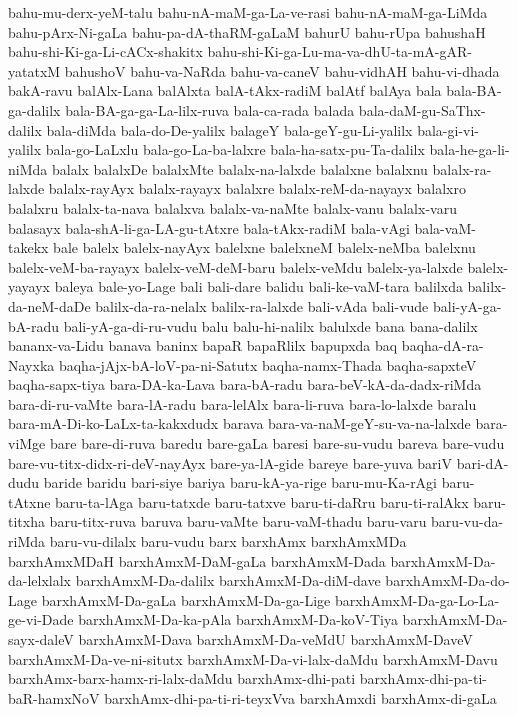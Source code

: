 {bahu-mu-derx-yeM-talu
bahu-nA-maM-ga-La-ve-rasi
bahu-nA-maM-ga-LiMda
bahu-pArx-Ni-gaLa
bahu-pa-dA-thaRM-gaLaM
bahurU
bahu-rUpa
bahushaH
bahu-shi-Ki-ga-Li-cACx-shakitx
bahu-shi-Ki-ga-Lu-ma-va-dhU-ta-mA-gAR-yatatxM
bahushoV
bahu-va-NaRda
bahu-va-caneV
bahu-vidhAH
bahu-vi-dhada
bakA-ravu
balAlx-Lana
balAlxta
balA-tAkx-radiM
balAtf
balAya
bala
bala-BA-ga-dalilx
bala-BA-ga-ga-La-lilx-ruva
bala-ca-rada
balada
bala-daM-gu-SaThx-dalilx
bala-diMda
bala-do-De-yalilx
balageY
bala-geY-gu-Li-yalilx
bala-gi-vi-yalilx
bala-go-LaLxlu
bala-go-La-ba-lalxre
bala-ha-satx-pu-Ta-dalilx
bala-he-ga-li-niMda
balalx
balalxDe
balalxMte
balalx-na-lalxde
balalxne
balalxnu
balalx-ra-lalxde
balalx-rayAyx
balalx-rayayx
balalxre
balalx-reM-da-nayayx
balalxro
balalxru
balalx-ta-nava
balalxva
balalx-va-naMte
balalx-vanu
balalx-varu
balasayx
bala-shA-li-ga-LA-gu-tAtxre
bala-tAkx-radiM
bala-vAgi
bala-vaM-takekx
bale
balelx
balelx-nayAyx
balelxne
balelxneM
balelx-neMba
balelxnu
balelx-veM-ba-rayayx
balelx-veM-deM-baru
balelx-veMdu
balelx-ya-lalxde
balelx-yayayx
baleya
bale-yo-Lage
bali
bali-dare
balidu
bali-ke-vaM-tara
balilxda
balilx-da-neM-daDe
balilx-da-ra-nelalx
balilx-ra-lalxde
bali-vAda
bali-vude
bali-yA-ga-bA-radu
bali-yA-ga-di-ru-vudu
balu
balu-hi-nalilx
balulxde
bana
bana-dalilx
bananx-va-Lidu
banava
baninx
bapaR
bapaRlilx
bapupxda
baq
baqha-dA-ra-Nayxka
baqha-jAjx-bA-loV-pa-ni-Satutx
baqha-namx-Thada
baqha-sapxteV
baqha-sapx-tiya
bara-DA-ka-Lava
bara-bA-radu
bara-beV-kA-da-dadx-riMda
bara-di-ru-vaMte
bara-lA-radu
bara-lelAlx
bara-li-ruva
bara-lo-lalxde
baralu
bara-mA-Di-ko-LaLx-ta-kakxdudx
barava
bara-va-naM-geY-su-va-na-lalxde
bara-viMge
bare
bare-di-ruva
baredu
bare-gaLa
baresi
bare-su-vudu
bareva
bare-vudu
bare-vu-titx-didx-ri-deV-nayAyx
bare-ya-lA-gide
bareye
bare-yuva
bariV
bari-dA-dudu
baride
baridu
bari-siye
bariya
baru-kA-ya-rige
baru-mu-Ka-rAgi
baru-tAtxne
baru-ta-lAga
baru-tatxde
baru-tatxve
baru-ti-daRru
baru-ti-ralAkx
baru-titxha
baru-titx-ruva
baruva
baru-vaMte
baru-vaM-thadu
baru-varu
baru-vu-da-riMda
baru-vu-dilalx
baru-vudu
barx
barxhAmx
barxhAmxMDa
barxhAmxMDaH
barxhAmxM-DaM-gaLa
barxhAmxM-Dada
barxhAmxM-Da-da-lelxlalx
barxhAmxM-Da-dalilx
barxhAmxM-Da-diM-dave
barxhAmxM-Da-do-Lage
barxhAmxM-Da-gaLa
barxhAmxM-Da-ga-Lige
barxhAmxM-Da-ga-Lo-La-ge-vi-Dade
barxhAmxM-Da-ka-pAla
barxhAmxM-Da-koV-Tiya
barxhAmxM-Da-sayx-daleV
barxhAmxM-Dava
barxhAmxM-Da-veMdU
barxhAmxM-DaveV
barxhAmxM-Da-ve-ni-situtx
barxhAmxM-Da-vi-lalx-daMdu
barxhAmxM-Davu
barxhAmx-barx-hamx-ri-lalx-daMdu
barxhAmx-dhi-pati
barxhAmx-dhi-pa-ti-baR-hamxNoV
barxhAmx-dhi-pa-ti-ri-teyxVva
barxhAmxdi
barxhAmx-di-gaLa
}
